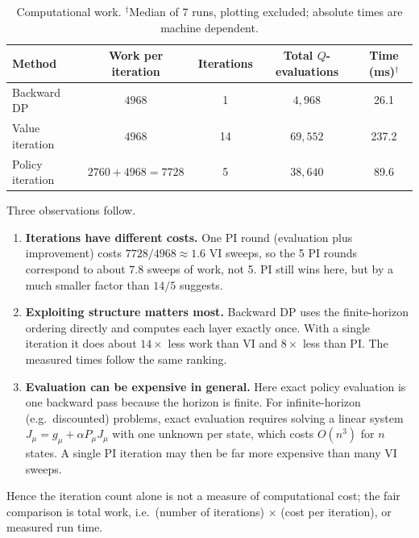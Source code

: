 \documentclass[11pt]{article}
\begin{document}
\begin{table}[H]
\centering
\small
\begin{tabular}{lcccc}
\toprule
Method & Work per iteration & Iterations & Total $Q$-evaluations & Time (ms)$^\dagger$ \\
\midrule
Backward DP & $4968$ & 1 & $4{,}968$ & 26.1 \\
Value iteration & $4968$ & 14 & $69{,}552$ & 237.2 \\
Policy iteration & $2760+4968=7728$ & 5 & $38{,}640$ & 89.6 \\
\bottomrule
\end{tabular}
\caption{Computational work. $^\dagger$Median of 7 runs, plotting excluded;
absolute times are machine dependent.}
\label{tab:work}
\end{table}

Three observations follow.
\begin{enumerate}
  \item \textbf{Iterations have different costs.} One PI round (evaluation plus
        improvement) costs $7728/4968 \approx 1.6$ VI sweeps, so the 5 PI rounds
        correspond to about $7.8$ sweeps of work, not 5. PI still wins here, but by
        a much smaller factor than $14/5$ suggests.
  \item \textbf{Exploiting structure matters most.} Backward DP uses the finite-horizon
        ordering directly and computes each layer exactly once. With a single
        iteration it does about $14\times$ less work than VI and $8\times$ less than PI.
        The measured times follow the same ranking.
  \item \textbf{Evaluation can be expensive in general.} Here exact policy evaluation is
        one backward pass because the horizon is finite. For infinite-horizon
        (e.g.\ discounted) problems, exact evaluation requires solving a linear
        system $J_\mu = g_\mu + \alpha P_\mu J_\mu$ with one unknown per state, which
        costs $O(n^3)$ for $n$ states. A single PI iteration may then be far more
        expensive than many VI sweeps.
\end{enumerate}
Hence the iteration count alone is not a measure of computational cost; the fair
comparison is total work, i.e.\ (number of iterations) $\times$ (cost per iteration),
or measured run time.
\end{document}
